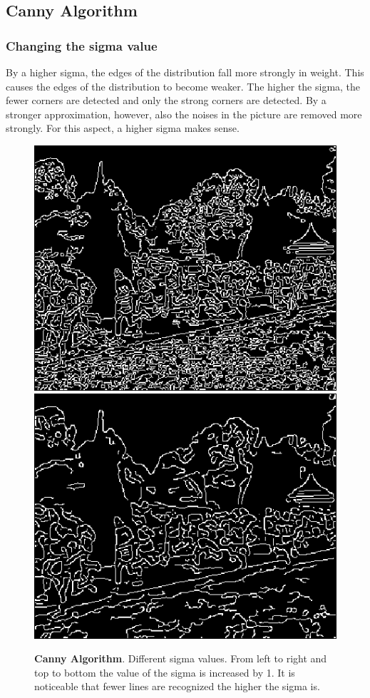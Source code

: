 \documentclass{article}
\begin{document}
	\subsection{Canny Algorithm}
	\subsubsection{Changing the sigma value}
	By a higher sigma, the edges of the distribution fall more strongly in weight. This causes the edges of the distribution to become weaker. 
	The higher the sigma, the fewer corners are detected and only the strong corners are detected. By a stronger approximation, 
	however, also the noises in the picture are removed more strongly. For this aspect, a higher sigma makes sense.
	\begin{figure}[!h]
		\center
		\caption{\textbf{Canny Algorithm}. Different sigma values. From left to right and top to bottom the value of the sigma is increased by 1. It is noticeable that fewer lines are recognized the higher the sigma is.}
		\includegraphics[scale=0.5]{E_canny_s1.png}
		\includegraphics[scale=0.5]{E_canny_s2.png}

\end{figure}
\end{document}
